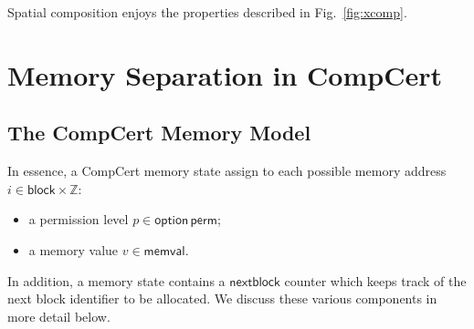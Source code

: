 \documentclass[acmsmall,nonacm]{acmart}
\newcommand{\kw}[1]{\ensuremath{ \mathsf{#1} }}
\begin{document}
\begin{theorem}
Spatial composition
enjoys the properties described in Fig.~\ref{fig:xcomp}.
\end{theorem}


\section{Memory Separation in CompCert} \label{app:sep} %




\subsection{The CompCert Memory Model}

In essence,
a CompCert memory state
assign to each possible memory address $i \in \kw{block} \times \mathbb{Z}$:
\begin{itemize}
  \item a permission level $p \in \kw{option}\,\kw{perm}$;
  \item a memory value $v \in \kw{memval}$.
\end{itemize}
In addition,
a memory state contains a $\kw{nextblock}$ counter
which keeps track of the next block identifier to be allocated.
We discuss these various components in more detail below.
\end{document}
